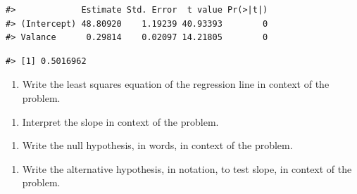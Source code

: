 \documentclass[
]{report}
\newenvironment{Shaded}{\begin{snugshade}}{\end{snugshade}}
\newcommand{\FunctionTok}[1]{\textcolor[rgb]{0.13,0.29,0.53}{\textbf{#1}}}
\newcommand{\NormalTok}[1]{#1}
\newcommand{\SpecialCharTok}[1]{\textcolor[rgb]{0.81,0.36,0.00}{\textbf{#1}}}
\providecommand{\tightlist}{%
  \setlength{\itemsep}{0pt}\setlength{\parskip}{0pt}}
\begin{document}
\begin{verbatim}
#>             Estimate Std. Error  t value Pr(>|t|)
#> (Intercept) 48.80920    1.19239 40.93393        0
#> Valance      0.29814    0.02097 14.21805        0
\end{verbatim}

\begin{Shaded}
\end{Shaded}

\begin{verbatim}
#> [1] 0.5016962
\end{verbatim}

\begin{enumerate}
\def\labelenumi{\arabic{enumi}.}
\setcounter{enumi}{1}
\tightlist
\item
  Write the least squares equation of the regression line in context of the problem.
\end{enumerate}

\vspace{0.5in}

\begin{enumerate}
\def\labelenumi{\arabic{enumi}.}
\setcounter{enumi}{2}
\tightlist
\item
  Interpret the slope in context of the problem.
\end{enumerate}

\vspace{0.5in}

\begin{enumerate}
\def\labelenumi{\arabic{enumi}.}
\setcounter{enumi}{3}
\tightlist
\item
  Write the null hypothesis, in words, in context of the problem.
\end{enumerate}

\vspace{1in}

\begin{enumerate}
\def\labelenumi{\arabic{enumi}.}
\setcounter{enumi}{4}
\tightlist
\item
  Write the alternative hypothesis, in notation, to test slope, in context of the problem.
\end{enumerate}

\vspace{0.5in}
\end{document}
